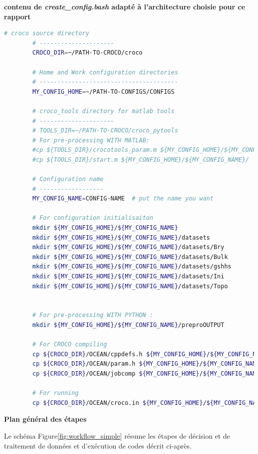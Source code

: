 \documentclass[10pt,a4paper,titlepage]{article}
\begin{document}
\begin{codeEnv}{\textbf{contenu de \textit{create\_config.bash} adapté à l’architecture choisie pour ce rapport}}\label{create_config}
    \begin{lstlisting}[language=bash]
        # croco source directory
        # ---------------------
        CROCO_DIR=~/PATH-TO-CROCO/croco

        # Home and Work configuration directories
        # ---------------------------------------
        MY_CONFIG_HOME=~/PATH-TO-CONFIGS/CONFIGS

        # croco_tools directory for matlab tools
        # ---------------------
        # TOOLS_DIR=~/PATH-TO-CROCO/croco_pytools
        # For pre-processing WITH MATLAB:
        #cp ${TOOLS_DIR}/crocotools_param.m ${MY_CONFIG_HOME}/${MY_CONFIG_NAME}/
        #cp ${TOOLS_DIR}/start.m ${MY_CONFIG_HOME}/${MY_CONFIG_NAME}/

        # Configuration name
        # ------------------
        MY_CONFIG_NAME=CONFIG-NAME  # put the name you want

        # For configuration initialisaiton
        mkdir ${MY_CONFIG_HOME}/${MY_CONFIG_NAME}
        mkdir ${MY_CONFIG_HOME}/${MY_CONFIG_NAME}/datasets
        mkdir ${MY_CONFIG_HOME}/${MY_CONFIG_NAME}/datasets/Bry
        mkdir ${MY_CONFIG_HOME}/${MY_CONFIG_NAME}/datasets/Bulk
        mkdir ${MY_CONFIG_HOME}/${MY_CONFIG_NAME}/datasets/gshhs
        mkdir ${MY_CONFIG_HOME}/${MY_CONFIG_NAME}/datasets/Ini
        mkdir ${MY_CONFIG_HOME}/${MY_CONFIG_NAME}/datasets/Topo


        # For pre-processing WITH PYTHON :
        mkdir ${MY_CONFIG_HOME}/${MY_CONFIG_NAME}/preproOUTPUT

        # For CROCO compiling
        cp ${CROCO_DIR}/OCEAN/cppdefs.h ${MY_CONFIG_HOME}/${MY_CONFIG_NAME}/
        cp ${CROCO_DIR}/OCEAN/param.h ${MY_CONFIG_HOME}/${MY_CONFIG_NAME}/
        cp ${CROCO_DIR}/OCEAN/jobcomp ${MY_CONFIG_HOME}/${MY_CONFIG_NAME}/

        # For running
        cp ${CROCO_DIR}/OCEAN/croco.in ${MY_CONFIG_HOME}/${MY_CONFIG_NAME}/

    \end{lstlisting}
\end{codeEnv}

\textbf{Plan général des étapes}



Le schéma Figure\ref{fig:workflow_simple} résume les étapes de décision et de traitement de données et d'exécution de codes décrit ci-après.
\end{document}
